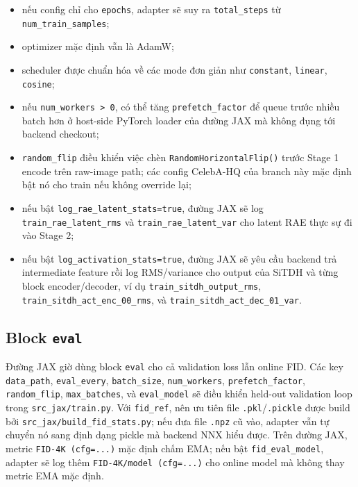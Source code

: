 \begin{itemize}[leftmargin=1.5em]
  \item nếu config chỉ cho \texttt{epochs}, adapter sẽ suy ra
  \texttt{total\_steps} từ \texttt{num\_train\_samples};
  \item optimizer mặc định vẫn là AdamW;
  \item scheduler được chuẩn hóa về các mode đơn giản như
  \texttt{constant}, \texttt{linear}, \texttt{cosine};
  \item nếu \texttt{num\_workers > 0}, có thể tăng
  \texttt{prefetch\_factor} để queue trước nhiều batch hơn ở host-side
  PyTorch loader của đường JAX mà không đụng tới backend checkout;
  \item \texttt{random\_flip} điều khiển việc chèn
  \texttt{RandomHorizontalFlip()} trước Stage 1 encode trên raw-image path;
  các config CelebA-HQ của branch này mặc định bật nó cho train nếu không
  override lại;
  \item nếu bật \texttt{log\_rae\_latent\_stats=true}, đường JAX sẽ log
  \texttt{train\_rae\_latent\_rms} và \texttt{train\_rae\_latent\_var} cho
  latent RAE thực sự đi vào Stage 2;
  \item nếu bật \texttt{log\_activation\_stats=true}, đường JAX sẽ yêu cầu
  backend trả intermediate feature rồi log RMS/variance cho output của SiTDH
  và từng block encoder/decoder, ví dụ
  \texttt{train\_sitdh\_output\_rms},
  \texttt{train\_sitdh\_act\_enc\_00\_rms}, và
  \texttt{train\_sitdh\_act\_dec\_01\_var}.
\end{itemize}

\subsection{Block \texttt{eval}}

Đường JAX giờ dùng block \texttt{eval} cho cả validation loss lẫn online FID.
Các key \texttt{data\_path}, \texttt{eval\_every}, \texttt{batch\_size},
\texttt{num\_workers}, \texttt{prefetch\_factor}, \texttt{random\_flip},
\texttt{max\_batches}, và \texttt{eval\_model} sẽ điều khiển held-out validation loop trong
\texttt{src\_jax/train.py}. Với
\texttt{fid\_ref}, nên ưu tiên file \texttt{.pkl}/\texttt{.pickle} được build
bởi \texttt{src\_jax/build\_fid\_stats.py}; nếu đưa file \texttt{.npz} cũ vào,
adapter vẫn tự chuyển nó sang định dạng pickle mà backend NNX hiểu được.
Trên đường JAX, metric \texttt{FID-4K (cfg=...)} mặc định chấm EMA; nếu bật
\texttt{fid\_eval\_model}, adapter sẽ log thêm
\texttt{FID-4K/model (cfg=...)} cho online model mà không thay metric EMA mặc
định.

